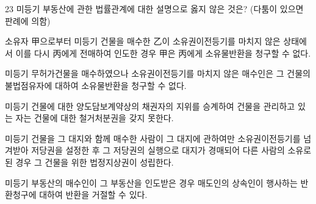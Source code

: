 \begin{question}{23}
미등기 부동산에 관한 법률관계에 대한 설명으로 옳지 않은 것은? (다툼이 있으면 판례에 의함)
\begin{choices}
  \item 소유자 甲으로부터 미등기 건물을 매수한 乙이 소유권이전등기를 마치지 않은 상태에서 이를 다시 丙에게 전매하여 인도한 경우 甲은 丙에게 소유물반환을 청구할 수 없다.
  \item 미등기 무허가건물을 매수하였으나 소유권이전등기를 마치지 않은 매수인은 그 건물의 불법점유자에 대하여 소유물반환을 청구할 수 없다.
  \item 미등기 건물에 대한 양도담보계약상의 채권자의 지위를 승계하여 건물을 관리하고 있는 자는 건물에 대한 철거처분권을 갖지 못한다.
  \item 미등기 건물을 그 대지와 함께 매수한 사람이 그 대지에 관하여만 소유권이전등기를 넘겨받아 저당권을 설정한 후 그 저당권의 실행으로 대지가 경매되어 다른 사람의 소유로 된 경우 그 건물을 위한 법정지상권이 성립한다.
  \item 미등기 부동산의 매수인이 그 부동산을 인도받은 경우 매도인의 상속인이 행사하는 반환청구에 대하여 반환을 거절할 수 있다.
\end{choices}
\end{question}
